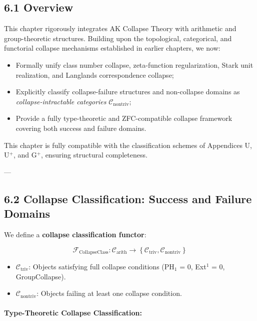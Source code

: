 \documentclass[11pt]{article}
\begin{document}
\subsection*{6.1 Overview}

This chapter rigorously integrates AK Collapse Theory with arithmetic and group-theoretic structures. Building upon the topological, categorical, and functorial collapse mechanisms established in earlier chapters, we now:

\begin{itemize}
    \item Formally unify class number collapse, zeta-function regularization, Stark unit realization, and Langlands correspondence collapse;
    \item Explicitly classify collapse-failure structures and non-collapse domains as \emph{collapse-intractable categories} \( \mathcal{C}_{\mathrm{nontriv}} \);
    \item Provide a fully type-theoretic and ZFC-compatible collapse framework covering both success and failure domains.
\end{itemize}

This chapter is fully compatible with the classification schemes of Appendices U, U$^{+}$, and G$^{+}$, ensuring structural completeness.

---

\subsection*{6.2 Collapse Classification: Success and Failure Domains}

We define a \textbf{collapse classification functor}:

\[
\mathcal{F}_{\mathrm{CollapseClass}} : \mathcal{C}_{\mathrm{arith}} \longrightarrow \left\{ \mathcal{C}_{\mathrm{triv}}, \mathcal{C}_{\mathrm{nontriv}} \right\}
\]

\begin{itemize}
    \item \( \mathcal{C}_{\mathrm{triv}} \): Objects satisfying full collapse conditions (PH$_1$ = 0, Ext$^1$ = 0, GroupCollapse).
    \item \( \mathcal{C}_{\mathrm{nontriv}} \): Objects failing at least one collapse condition.
\end{itemize}

\paragraph{Type-Theoretic Collapse Classification:}
\end{document}
